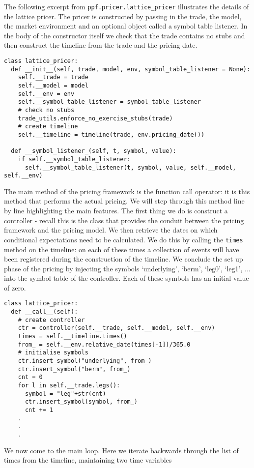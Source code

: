 The following excerpt from \verb|ppf.pricer.lattice_pricer|
illustrates the details of the lattice pricer. The pricer is
constructed by passing in the trade, the model, the market environment
and an optional object called a symbol table listener. In the body of
the constructor itself we check that the trade contains no stubs and
then construct the timeline from the trade and the pricing date. 
\begin{verbatim}
class lattice_pricer:
  def __init__(self, trade, model, env, symbol_table_listener = None):
    self.__trade = trade
    self.__model = model
    self.__env = env
    self.__symbol_table_listener = symbol_table_listener
    # check no stubs
    trade_utils.enforce_no_exercise_stubs(trade)
    # create timeline
    self.__timeline = timeline(trade, env.pricing_date())   

  def __symbol_listener_(self, t, symbol, value):
    if self.__symbol_table_listener:
      self.__symbol_table_listener(t, symbol, value, self.__model, self.__env)
\end{verbatim}
The main method of the pricing framework is the function call operator: it
is this method that performs the actual pricing. We will step through
this method line by line highlighting the main features. The first
thing we do is construct a controller - recall this is the class that
provides the conduit between the pricing framework and the pricing
model. We then retrieve the dates on which conditional expectations
need to be calculated. We do this by calling the \verb|times| method
on the timeline: on each of these times a collection of events will
have been registered during the construction of the timeline. We
conclude the set up phase of the pricing by injecting the symbols
`underlying', `berm', `leg0', `leg1', ... into the symbol
table of the controller. Each of these symbols has an initial value of
zero.
\begin{verbatim}
class lattice_pricer:
  def __call__(self):
    # create controller
    ctr = controller(self.__trade, self.__model, self.__env)
    times = self.__timeline.times()
    from_ = self.__env.relative_date(times[-1])/365.0
    # initialise symbols
    ctr.insert_symbol("underlying", from_)
    ctr.insert_symbol("berm", from_)
    cnt = 0
    for l in self.__trade.legs():
      symbol = "leg"+str(cnt)
      ctr.insert_symbol(symbol, from_)      
      cnt += 1
    .
    .
    .
\end{verbatim}
We now come to the main loop. Here we iterate backwards through the
list of times from the timeline, maintaining two time variables
